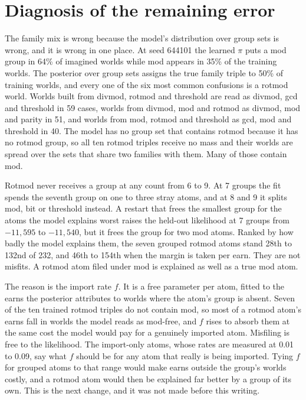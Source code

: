 \documentclass[11pt]{article}
\begin{document}
\section{Diagnosis of the remaining error}

The family mix is wrong because the model's distribution over group sets is wrong, and it is wrong in one place. At seed 644101 the learned $\pi$ puts a mod group in 64\% of imagined worlds while mod appears in 35\% of the training worlds. The posterior over group sets assigns the true family triple to 50\% of training worlds, and every one of the six most common confusions is a rotmod world. Worlds built from divmod, rotmod and threshold are read as divmod, gcd and threshold in 59 cases, worlds from divmod, mod and rotmod as divmod, mod and parity in 51, and worlds from mod, rotmod and threshold as gcd, mod and threshold in 40. The model has no group set that contains rotmod because it has no rotmod group, so all ten rotmod triples receive no mass and their worlds are spread over the sets that share two families with them. Many of those contain mod.

Rotmod never receives a group at any count from 6 to 9. At 7 groups the fit spends the seventh group on one to three stray atoms, and at 8 and 9 it splits mod, bit or threshold instead. A restart that frees the smallest group for the atoms the model explains worst raises the held-out likelihood at 7 groups from $-11{,}595$ to $-11{,}540$, but it frees the group for two mod atoms. Ranked by how badly the model explains them, the seven grouped rotmod atoms stand 28th to 132nd of 232, and 46th to 154th when the margin is taken per earn. They are not misfits. A rotmod atom filed under mod is explained as well as a true mod atom.

The reason is the import rate $f$. It is a free parameter per atom, fitted to the earns the posterior attributes to worlds where the atom's group is absent. Seven of the ten trained rotmod triples do not contain mod, so most of a rotmod atom's earns fall in worlds the model reads as mod-free, and $f$ rises to absorb them at the same cost the model would pay for a genuinely imported atom. Misfiling is free to the likelihood. The import-only atoms, whose rates are measured at 0.01 to 0.09, say what $f$ should be for any atom that really is being imported. Tying $f$ for grouped atoms to that range would make earns outside the group's worlds costly, and a rotmod atom would then be explained far better by a group of its own. This is the next change, and it was not made before this writing.
\end{document}

